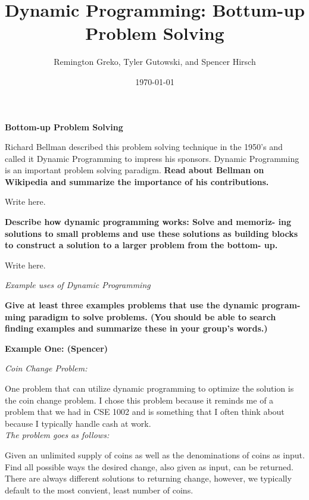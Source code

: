 \documentclass{article}
\begin{document}
\title{\textbf{Dynamic Programming: Bottum-up Problem Solving}}
\author{Remington Greko, Tyler Gutowski, and Spencer Hirsch}
\date{\today}

\maketitle

\noindent \textbf{Bottom-up Problem Solving} 


\noindent Richard Bellman described this problem solving technique in the
1950’s and called it Dynamic Programming to impress his sponsors.
Dynamic Programming is an important problem solving paradigm.
\textbf{Read about Bellman on Wikipedia and summarize the importance
of his contributions.}

\medskip

Write here.

\bigskip

\noindent \textbf{Describe how dynamic programming works: Solve and memoriz-
ing solutions to small problems and use these solutions as building
blocks to construct a solution to a larger problem from the bottom-
up.}

\medskip

Write here.

\bigskip

\noindent \textit{Example uses of Dynamic Programming}


\textbf{Give at least three examples problems that use the dynamic program-
ming paradigm to solve problems. (You should be able to search
finding examples and summarize these in your group’s words.)}

\bigskip

\noindent \textbf{Example One: (Spencer)}

\noindent \textit{Coin Change Problem:}

One problem that can utilize dynamic programming to optimize the
solution is the coin change problem. I chose this problem because 
it reminds me of a problem that we had in CSE 1002 and is something
that I often think about because I typically handle cash at work.\\

\noindent \textit{The problem goes as follows:}

Given an unlimited supply of coins as well as the denominations of
coins as input. Find all possible ways the desired change, also given 
as input, can be returned. There are always different solutions to
returning change, however, we typically default to the most convient,
least number of coins.\\
\end{document}
